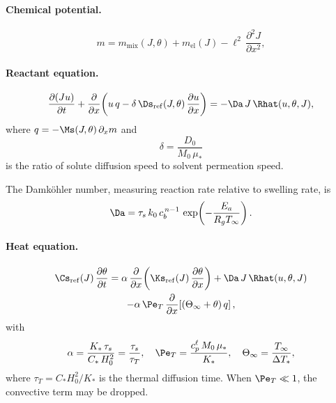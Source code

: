 \paragraph{Chemical potential.}
\begin{equation}
  m = m_\mathrm{mix}(J,\theta) + m_\mathrm{el}(J) - \ell^2\,\frac{\partial^2 J}{\partial x^2},
  \label{eq:m_nondim_box}
\end{equation}

\paragraph{Reactant equation.}
\begin{equation}
  \frac{\partial(J u)}{\partial t}
  + \frac{\partial}{\partial x}\!\left(u\,q - \delta\,\Ds_\mathrm{ref}(J,\theta)\,\frac{\partial u}{\partial x}\right)
  = -\Da\,J\,\Rhat(u,\theta,J),
  \label{eq:u_nondim}
\end{equation}
where $q = -\Ms(J,\theta)\,\partial_x m$ and
\begin{equation}
  \delta = \frac{D_0}{M_0\,\mu_*}
\end{equation}
is the ratio of solute diffusion speed to solvent permeation speed.

The Damk\"ohler number, measuring reaction rate relative to swelling rate, is
\begin{equation}
  \Da = \tau_s\,k_0\,c_b^{\,n-1}\,\exp\!\left(-\frac{E_a}{R_g T_\infty}\right).
  \label{eq:Da}
\end{equation}

\paragraph{Heat equation.}
\begin{multline}
  \Cs_\mathrm{ref}(J)\,\frac{\partial\theta}{\partial t}
  = \alpha\,\frac{\partial}{\partial x}\!\left(\Ks_\mathrm{ref}(J)\,\frac{\partial\theta}{\partial x}\right)
  + \Da\,J\,\Rhat(u,\theta,J)
  \\
  - \alpha\,\Pe_T\,\frac{\partial}{\partial x}\!\left[(\Theta_\infty + \theta)\,q\right],
  \label{eq:theta_nondim}
\end{multline}
with
\begin{equation}
  \alpha = \frac{K_*\,\tau_s}{C_*\,H_0^2} = \frac{\tau_s}{\tau_T},
  \quad
  \Pe_T = \frac{c_p^\ell\,M_0\,\mu_*}{K_*},
  \quad
  \Theta_\infty = \frac{T_\infty}{\Delta T_*},
  \label{eq:thermal_params}
\end{equation}
where $\tau_T = C_*H_0^2/K_*$ is the thermal diffusion time.
When $\Pe_T \ll 1$, the convective term may be dropped.

